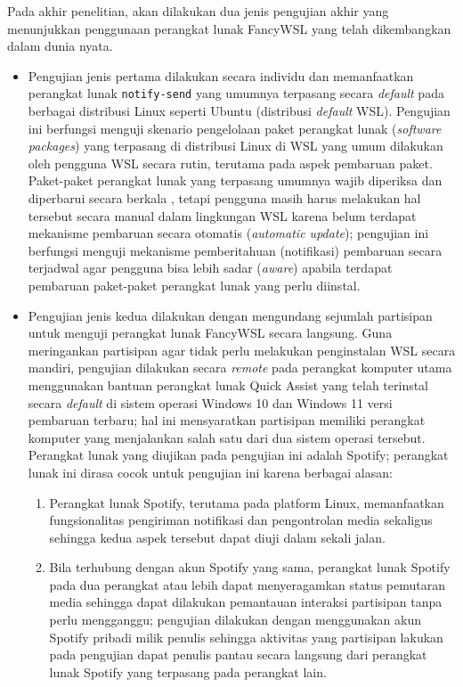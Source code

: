 Pada akhir penelitian, akan dilakukan dua jenis pengujian akhir yang menunjukkan penggunaan perangkat lunak FancyWSL yang telah dikembangkan dalam dunia nyata.
\begin{itemize}
    \item Pengujian jenis pertama dilakukan secara individu dan memanfaatkan perangkat lunak \verb|notify-send| yang umumnya terpasang secara \textit{default} pada berbagai distribusi Linux seperti Ubuntu (distribusi \textit{default} WSL). Pengujian ini berfungsi menguji skenario pengelolaan paket perangkat lunak (\textit{software packages}) yang terpasang di distribusi Linux di WSL yang umum dilakukan oleh pengguna WSL secara rutin, terutama pada aspek pembaruan paket. Paket-paket perangkat lunak yang terpasang umumnya wajib diperiksa dan diperbarui secara berkala \cite{legay2020package}, tetapi pengguna masih harus melakukan hal tersebut secara manual dalam lingkungan WSL karena belum terdapat mekanisme pembaruan secara otomatis (\textit{automatic update}); pengujian ini berfungsi menguji mekanisme pemberitahuan (notifikasi) pembaruan secara terjadwal agar pengguna bisa lebih sadar (\textit{aware}) apabila terdapat pembaruan paket-paket perangkat lunak yang perlu diinstal.

    \item Pengujian jenis kedua dilakukan dengan mengundang sejumlah partisipan untuk menguji perangkat lunak FancyWSL secara langsung. Guna meringankan partisipan agar tidak perlu melakukan penginstalan WSL secara mandiri, pengujian dilakukan secara \textit{remote} pada perangkat komputer utama menggunakan bantuan perangkat lunak Quick Assist yang telah terinstal secara \textit{default} di sistem operasi Windows 10 dan Windows 11 versi pembaruan terbaru; hal ini mensyaratkan partisipan memiliki perangkat komputer yang menjalankan salah satu dari dua sistem operasi tersebut. Perangkat lunak yang diujikan pada pengujian ini adalah Spotify; perangkat lunak ini dirasa cocok untuk pengujian ini karena berbagai alasan:
    \begin{enumerate}
        \item Perangkat lunak Spotify, terutama pada platform Linux, memanfaatkan fungsionalitas pengiriman notifikasi dan pengontrolan media sekaligus sehingga kedua aspek tersebut dapat diuji dalam sekali jalan.
        \item Bila terhubung dengan akun Spotify yang sama, perangkat lunak Spotify pada dua perangkat atau lebih dapat menyeragamkan status pemutaran media sehingga dapat dilakukan pemantauan interaksi partisipan tanpa perlu mengganggu; pengujian dilakukan dengan menggunakan akun Spotify pribadi milik penulis sehingga aktivitas yang partisipan lakukan pada pengujian dapat penulis pantau secara langsung dari perangkat lunak Spotify yang terpasang pada perangkat lain.
    \end{enumerate}
\end{itemize}

